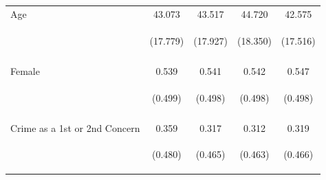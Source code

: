 \begin{center}
\begin{tabular}{lcccc}
\noalign{\smallskip}Age & 43.073 & 43.517 & 44.720 & 42.575\\
 & \begin{footnotesize}(17.779)\end{footnotesize} & \begin{footnotesize}(17.927)\end{footnotesize} & \begin{footnotesize}(18.350)\end{footnotesize} & \begin{footnotesize}(17.516)\end{footnotesize}\\
 & \begin{footnotesize}\end{footnotesize} & \begin{footnotesize}\end{footnotesize} & \begin{footnotesize}\end{footnotesize} & \begin{footnotesize}\end{footnotesize}\\
\noalign{\smallskip}Female & 0.539 & 0.541 & 0.542 & 0.547\\
 & \begin{footnotesize}(0.499)\end{footnotesize} & \begin{footnotesize}(0.498)\end{footnotesize} & \begin{footnotesize}(0.498)\end{footnotesize} & \begin{footnotesize}(0.498)\end{footnotesize}\\
 & \begin{footnotesize}\end{footnotesize} & \begin{footnotesize}\end{footnotesize} & \begin{footnotesize}\end{footnotesize} & \begin{footnotesize}\end{footnotesize}\\
\noalign{\smallskip}Crime as a 1st or 2nd Concern  & 0.359 & 0.317 & 0.312 & 0.319\\
 & \begin{footnotesize}(0.480)\end{footnotesize} & \begin{footnotesize}(0.465)\end{footnotesize} & \begin{footnotesize}(0.463)\end{footnotesize} & \begin{footnotesize}(0.466)\end{footnotesize}\\

\end{tabular}
\end{center}
